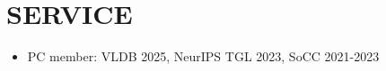 \documentclass[centered,overlapped]{res}
\begin{document}
\begin{resume}
\begin{enumerate}
\end{enumerate}

\section{SERVICE}
  \begin{itemize}  \itemsep -2pt
  \item PC member: VLDB 2025, NeurIPS TGL 2023, SoCC 2021-2023
  \end{itemize}

%


\end{resume}
\end{document}
